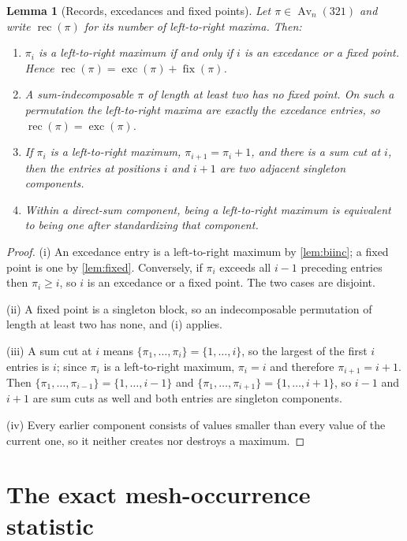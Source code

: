 \documentclass[11pt,letterpaper]{article}
\numberwithin{equation}{section}
\newtheorem{lemma}[theorem]{Lemma}
\theoremstyle{definition}
\DeclareMathOperator{\Av}{Av}
\DeclareMathOperator{\exc}{exc}
\DeclareMathOperator{\fix}{fix}
\DeclareMathOperator{\rec}{rec}
\begin{document}
\begin{lemma}[Records, excedances and fixed points]
\label{lem:records}
Let $\pi\in\Av_n(321)$ and write $\rec(\pi)$ for its number of
left-to-right maxima. Then:
\begin{enumerate}[label=\upshape(\roman*)]
\item $\pi_i$ is a left-to-right maximum if and only if $i$ is an
  excedance or a fixed point. Hence
  $\rec(\pi)=\exc(\pi)+\fix(\pi)$.
\item A sum-indecomposable $\pi$ of length at least two has no fixed
  point. On such a permutation the left-to-right maxima are exactly the
  excedance entries, so $\rec(\pi)=\exc(\pi)$.
\item If $\pi_i$ is a left-to-right maximum, $\pi_{i+1}=\pi_i+1$, and
  there is a sum cut at $i$, then the entries at positions $i$ and $i+1$
  are two adjacent singleton components.
\item Within a direct-sum component, being a left-to-right maximum is
  equivalent to being one after standardizing that component.
\end{enumerate}
\end{lemma}
\begin{proof}
(i) An excedance entry is a left-to-right maximum by \cref{lem:biinc};
a fixed point is one by \cref{lem:fixed}. Conversely, if $\pi_i$ exceeds
all $i-1$ preceding entries then $\pi_i\ge i$, so $i$ is an excedance or
a fixed point. The two cases are disjoint.

(ii) A fixed point is a singleton block, so an indecomposable permutation
of length at least two has none, and (i) applies.

(iii) A sum cut at $i$ means $\{\pi_1,\ldots,\pi_i\}=\{1,\ldots,i\}$, so
the largest of the first $i$ entries is $i$; since $\pi_i$ is a
left-to-right maximum, $\pi_i=i$ and therefore $\pi_{i+1}=i+1$. Then
$\{\pi_1,\ldots,\pi_{i-1}\}=\{1,\ldots,i-1\}$ and
$\{\pi_1,\ldots,\pi_{i+1}\}=\{1,\ldots,i+1\}$, so $i-1$ and $i+1$ are
sum cuts as well and both entries are singleton components.

(iv) Every earlier component consists of values smaller than every value
of the current one, so it neither creates nor destroys a maximum.
\end{proof}

\section{The exact mesh-occurrence statistic}
\label{sec:mesh}
\end{document}
